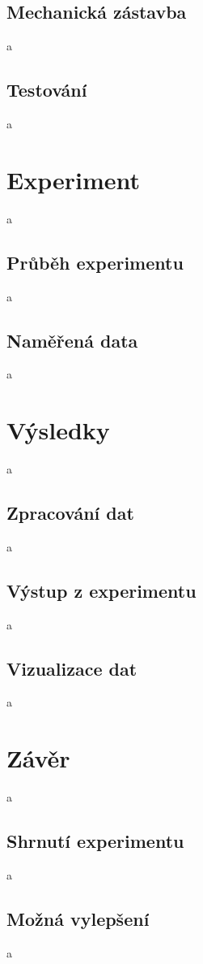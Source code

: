 \documentclass[twoside]{ctuthesis}
\theoremstyle{plain}
\theoremstyle{definition}
\theoremstyle{note}
\begin{document}
\section{Mechanická zástavba}
a
\section{Testování}
a




\chapter{Experiment}
a
\section{Průběh experimentu}
a
\section{Naměřená data}
a


\chapter{Výsledky}
a

\section{Zpracování dat}
a

\section{Výstup z experimentu}
a

\section{Vizualizace dat}
a




\chapter{Závěr}
a
\section{Shrnutí experimentu}
a
\section{Možná vylepšení}
a




\appendix

\printindex

\appendix




\end{document}
